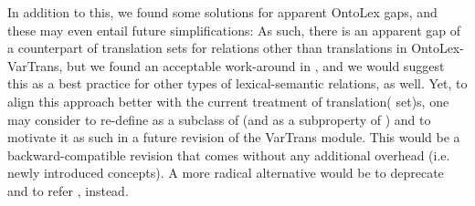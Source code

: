 In addition to this, we found some solutions for apparent OntoLex gaps, and these may even entail future simplifications:
As such, there is an apparent gap of a counterpart of translation sets for relations other than translations in OntoLex-VarTrans, 
but we found an acceptable work-around in , and we would suggest this as a best practice for other types of lexical-semantic relations, as well. Yet, to align this approach better with the current treatment of translation( set)s, one may consider to  re-define  as a subclass of  (and  as a subproperty of ) and to motivate it as such in a future revision of the VarTrans module. This would be a backward-compatible revision that comes without any additional overhead (i.e. newly introduced concepts). A more radical alternative would be to deprecate  and to refer , instead.

